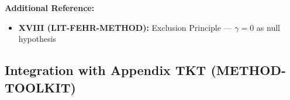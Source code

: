 \textbf{Additional Reference:}
\begin{itemize}[nosep]
    \item \textbf{XVIII (LIT-FEHR-METHOD):} Exclusion Principle --- $\gamma = 0$ as null hypothesis
\end{itemize}


\subsection{Integration with Appendix TKT (METHOD-TOOLKIT)}
\label{sec:av-hhh-integration}

